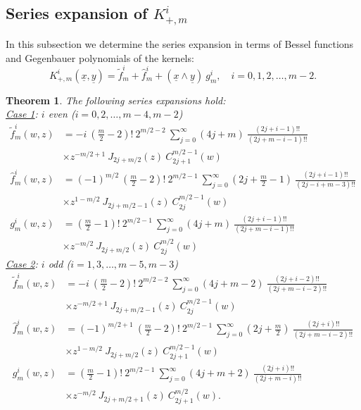 \documentclass{amsart}
\newtheorem{theorem}{Theorem}[section]
\theoremstyle{remark}
\begin{document}
\subsection{Series expansion of $K_{+,m}^i$}
In this subsection we determine the series expansion in terms of Bessel functions and Gegenbauer polynomials of the kernels:
\[
K_{+,m}^{i}({\underline{x}},{\underline{y}}) = \tilde{f}_m^i + \hat{f}_m^i + ({\underline{x}} \wedge {\underline{y}}) \ g_m^i, \quad i = 0,1, 2, \ldots , m-2.
\]

\begin{theorem} 
\label{SeriesEven}
The following series expansions hold:\vspace{0,2cm}\\
\emph{\underline{Case 1}: $i$ even ($i=0,2,\ldots,m-4,m-2$)}
\begin{align*}
\tilde{f}_m^i(w,z) &=  - i \ \left( \frac{m}{2}-2 \right)! \ 2^{m/2-2}  \  \sum_{j=0}^{\infty} (4j+m) \ \frac{(2j+i-1)!!}{(2j+m-i-1)!!}\\
 & \times  z^{-m/2+1} \ J_{2j+m/2}(z) \ C_{2j+1}^{m/2-1}(w)\\
 \hat{f}_m^i(w,z) &=  (-1)^{m/2} \ \left( \frac{m}{2}-2 \right)! \ 2^{m/2-1} \ \sum_{j=0}^{\infty} \left( 2j + \frac{m}{2}-1 \right) \ \frac{(2j+i-1)!!}{(2j-i+m-3)!!}\\
& \times z^{1-m/2} \ J_{2j+m/2-1}(z) \ C_{2j}^{m/2-1}(w)\\
g_m^i(w,z) &=   \left( \frac{m}{2}-1 \right)! \ 2^{m/2-1} \ \sum_{j=0}^{\infty} (4j+m) \ \frac{(2j+i-1)!!}{(2j+m-i-1)!!}\\
& \times   z^{-m/2} \ J_{2j+m/2}(z) \ C_{2j}^{m/2}(w)
\end{align*}
\emph{\underline{Case 2}: $i$ odd ($i=1,3,\ldots, m-5, m-3$)}
\begin{align*}
\tilde{f}_m^i(w,z) &= - i \ \left( \frac{m}{2}-2 \right)! \ 2^{m/2-2}  \  \sum_{j=0}^{\infty} (4j+m-2) \ \frac{(2j+i-2)!!}{(2j+m-i-2)!!}\\
& \times   z^{-m/2+1} \ J_{2j+m/2-1}(z) \ C_{2j}^{m/2-1}(w)\\
\hat{f}_m^i(w,z) &= (-1)^{m/2+1} \  \left( \frac{m}{2}-2\right)! \ 2^{m/2-1} \ \sum_{j=0}^{\infty} \left( 2j + \frac{m}{2} \right) \ \frac{(2j+i)!!}{(2j+m-i-2)!!}\\
& \times  z^{1-m/2} \ J_{2j+m/2}(z) \ C_{2j+1}^{m/2-1}(w)\\
g_m^i(w,z) &=   \left( \frac{m}{2}-1 \right)! \ 2^{m/2-1} \ \sum_{j=0}^{\infty}(4j+m+2) \  \frac{(2j+i)!!}{(2j+m-i)!!}\\
& \times    z^{-m/2} \ J_{2j+m/2+1}(z) \ C_{2j+1}^{m/2}(w) .
\end{align*}
\end{theorem}
\end{document}
